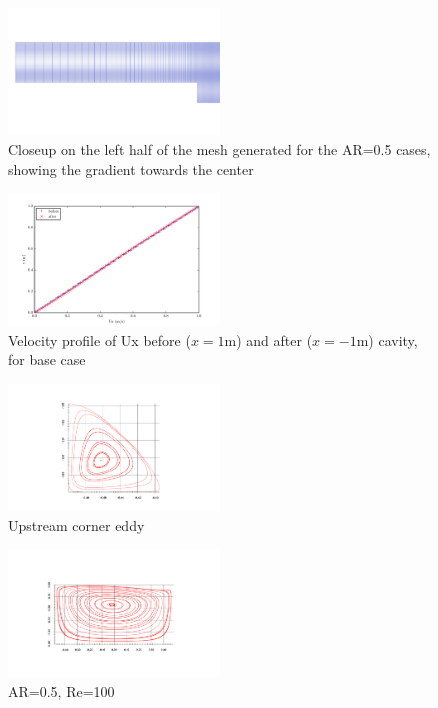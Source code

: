 \documentclass[twocolumn,10pt]{asme2ej}
\begin{document}
\begin{figure}[tb]
\begin{center}
\includegraphics[width=0.5\textwidth]{figure/half_grid.pdf}
\caption{Closeup on the left half of the mesh generated for the AR=0.5 cases, showing the gradient towards the center}
\label{grid_figure}
\end{center}
\end{figure}

\begin{figure}[tb]
\begin{center}
\includegraphics[width=0.5\textwidth]{figure/Ar0.5-Re100 Ux before and after.pdf}
\caption{Velocity profile of Ux before ($x = 1 $m) and after ($x = -1 $m) cavity, for base case}
\label{velocity_profile}
\end{center}
\end{figure}

\begin{figure}[tb]
\begin{center}
\includegraphics[width=0.5\textwidth]{figure/LeftCornerLarge.pdf}
\caption{Upstream corner eddy}
\label{velocity_profile}
\end{center}
\end{figure}

\begin{figure}[tb]
\begin{center}
\includegraphics[width=0.5\textwidth]{figure/AR0.5-Re100 streamFunction axis final.pdf}
\caption{AR=0.5, Re=100}
\label{}
\end{center}
\end{figure}
\end{document}
